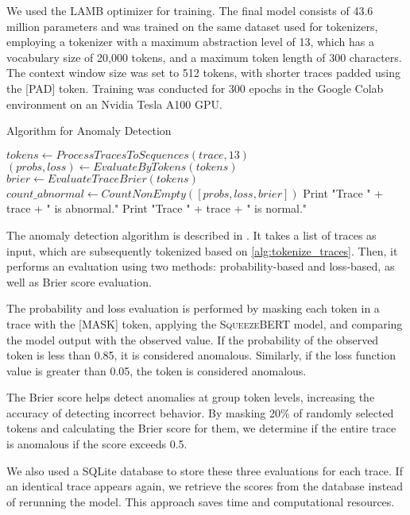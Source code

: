 \documentclass[sigplan,nonacm]{acmart}
\begin{document}
We used the LAMB optimizer \cite{you2019large} for training. The final model consists of 43.6 million parameters and was trained on the same dataset used for tokenizers, employing a tokenizer with a maximum abstraction level of 13, which has a vocabulary size of 20,000 tokens, and a maximum token length of 300 characters. The context window size was set to 512 tokens, with shorter traces padded using the [PAD] token. Training was conducted for 300 epochs in the Google Colab environment on an Nvidia Tesla A100 GPU.

\begin{algorithm}
\scriptsize
\caption{Algorithm for Anomaly Detection}
\label{alg:anomaly_detection}
\begin{algorithmic}[1]
        \State $tokens \gets ProcessTracesToSequences(trace, 13)$
        \State $(probs, loss) \gets EvaluateByTokens(tokens)$
        \State $brier \gets EvaluateTraceBrier(tokens)$
        \State $count\_abnormal \gets 
        CountNonEmpty([probs, loss, brier])$
            \State Print "Trace " + trace + " is abnormal."
        \Else
            \State Print "Trace " + trace + " is normal."
        \EndIf
    \EndFor
\EndFunction
\end{algorithmic}
\end{algorithm}

The anomaly detection algorithm is described in . It takes a list of traces as input, which are subsequently tokenized based on \cref{alg:tokenize_traces}. Then, it performs an evaluation using two methods: probability-based and loss-based, as well as Brier score evaluation.

The probability and loss evaluation is performed by masking each token in a trace with the [MASK] token, applying the \textsc{SqueezeBERT} model, and comparing the model output with the observed value. If the probability of the observed token is less than 0.85, it is considered anomalous. Similarly, if the loss function value is greater than 0.05, the token is considered anomalous.

The Brier score helps detect anomalies at group token levels, increasing the accuracy of detecting incorrect behavior. By masking 20\% of randomly selected tokens and calculating the Brier score for them, we determine if the entire trace is anomalous if the score exceeds 0.5.

We also used a SQLite database to store these three evaluations for each trace. If an identical trace appears again, we retrieve the scores from the database instead of rerunning the model. This approach saves time and computational resources.
\end{document}
